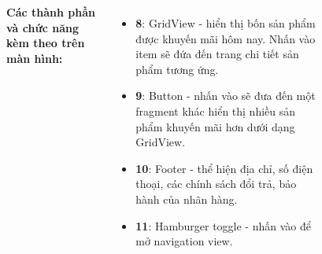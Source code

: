 \documentclass{beamer}
\begin{document}
\begin{frame}
\begin{columns}
\begin{figure}
        \end{figure}
        \indent \textbf{Các thành phần và chức năng kèm theo trên màn hình:}
        \begin{itemize}
            \item \textbf{8}: GridView - hiển thị bốn sản phẩm được khuyến mãi hôm nay. Nhấn vào item sẽ đứa đến trang chi tiết sản phẩm tương ứng.
            \item \textbf{9}: Button - nhấn vào sẽ đưa đến một fragment khác hiển thị nhiều sản phẩm khuyến mãi hơn dưới dạng GridView.
            \item \textbf{10}: Footer - thể hiện địa chỉ, số điện thoại, các chính sách đổi trả, bảo hành của nhãn hàng.
            \item \textbf{11}: Hamburger toggle - nhấn vào để mở navigation view.
        \end{itemize}
    \end{columns}
\end{frame}
\end{document}
